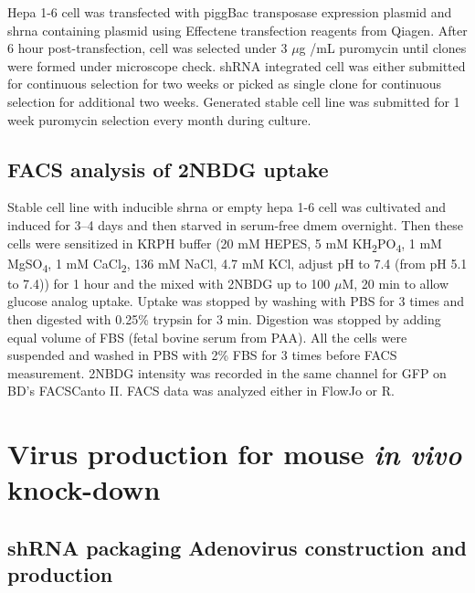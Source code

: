 Hepa 1-6 cell was transfected with piggBac transposase expression plasmid and \gls{shrna} containing plasmid using Effectene\textsuperscript{\textregistered} transfection reagents from Qiagen. After 6 hour post-transfection, cell was selected under 3 $\mu$g \slash mL puromycin until clones were formed under microscope check. shRNA integrated cell was either submitted for continuous selection for two weeks or picked as single clone for continuous selection for additional two weeks. Generated stable cell line was submitted for 1 week puromycin selection every month during culture.

\subsection{FACS analysis of 2NBDG uptake}

Stable cell line with inducible \gls{shrna} or empty hepa 1-6 cell was cultivated and induced for 3--4 days and then starved in serum-free \gls{dmem} overnight. Then these cells were sensitized in KRPH buffer (20 mM HEPES, 5 mM KH\textsubscript{2}PO\textsubscript{4}, 1 mM MgSO\textsubscript{4}, 1 mM CaCl\textsubscript{2}, 136 mM NaCl, 4.7 mM KCl, adjust pH to 7.4 (from pH 5.1 to 7.4)) for 1 hour and the mixed with 2NBDG up to 100 $\mu$M, 20 min to allow glucose analog uptake. Uptake was stopped by washing with PBS for 3 times and then digested with 0.25\% trypsin for 3 min. Digestion was stopped by adding equal volume of FBS (fetal bovine serum from PAA). All the cells were suspended and washed in PBS with 2\% FBS for 3 times before FACS measurement. 2NBDG intensity was recorded in the same channel for GFP on BD's FACSCanto\textsuperscript{\texttrademark} II. FACS data was analyzed either in FlowJo or R.


\section{Virus production for mouse \textit{in vivo} knock-down}

\subsection{shRNA packaging Adenovirus construction and production}

